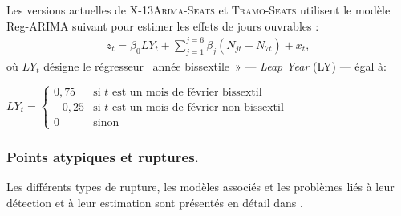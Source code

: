 \documentclass[12pt, a4paper, french]{article}
\begin{document}
Les versions actuelles de \textsc{X-13Arima-Seats} et \textsc{Tramo-Seats} utilisent le modèle Reg-ARIMA suivant pour estimer les effets de jours ouvrables :
\begin{eqnarray}
	\label{eq:eq3}
z_t=\beta_0 LY_t + \sum_{j=1}^{j=6} \beta_j \left(N_{jt} - N_{7t}\right) + x_t,
\end{eqnarray}
où $LY_t$ désigne le régresseur \og~année bissextile~» --- \emph{Leap Year} (LY) --- égal à:

$
LY_{t} = \left\{ \begin{array}{rl} 
                0,75 & \mbox{si } t \mbox{ est un mois de février bissextil } \\
                -0,25 & \mbox{si } t \mbox{ est un mois de février non bissextil } \\
                0 & \mbox{sinon}
               \end{array}
         \right.
$


\subsubsection{Points atypiques et ruptures.}
\label{sec:PAR}

Les différents types de rupture, les modèles associés et les problèmes liés à leur détection et à leur estimation sont présentés en détail dans \cite{Me2018}.
\end{document}
